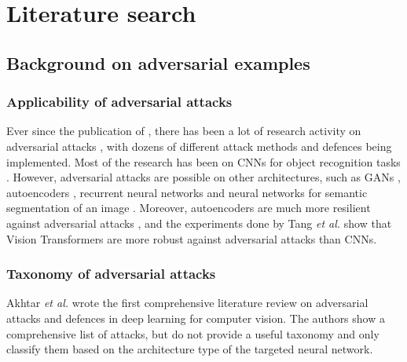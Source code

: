 \documentclass[11pt, a4paper, oneside]{article}
\begin{document}
\section{Literature search}
    \label{sec:literature_search}
  
\subsection{Background on adversarial examples}
 
\subsubsection{Applicability of adversarial attacks}
  
Ever since the publication of \cite{szegedy2014intriguing}, there has been a lot of research activity on adversarial attacks \cite{akhtar, silva_survey, tnnls_survey}, with dozens of different attack methods and defences being implemented. Most of the research has been on CNNs for object recognition tasks \cite{akhtar}. However, adversarial attacks are possible on other architectures, such as GANs \cite{kos_attacks_on_gans}, autoencoders \cite{tabacof_attacks_autoencoders}, recurrent neural networks \cite{papernot_attacks_rnns} and neural networks for semantic segmentation of an image \cite{Metzen_2017_ICCV}. Moreover, autoencoders are much more resilient against adversarial attacks \cite{tabacof_attacks_autoencoders}, and the experiments done by Tang \textit{et al.} \cite{robustart} show that Vision Transformers are more robust against adversarial attacks than CNNs.

\subsubsection{Taxonomy of adversarial attacks}

Akhtar \textit{et al.} \cite{akhtar} wrote the first comprehensive literature review on adversarial attacks and defences in deep learning for computer vision. The authors show a comprehensive list of attacks, but do not provide a useful taxonomy and only classify them based on the architecture type of the targeted neural network. 
\end{document}
